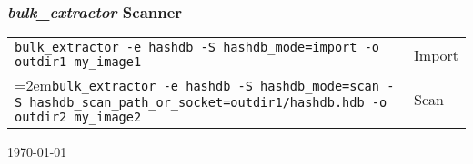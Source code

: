 \documentclass[12pt]{article}
\newcommand{\bulk}{\emph{bulk\_extractor}\xspace}
\begin{document}
\subsubsection*{\bulk Scanner}
\begin{tabular}{p{15 cm} p{4 cm} }
\texttt{bulk\_extractor -e hashdb -S hashdb\_mode=import -o outdir1 my\_image1} & Import \\
\hangindent=2em\texttt{bulk\_extractor -e hashdb -S hashdb\_mode=scan -S hashdb\_scan\_path\_or\_socket=outdir1/hashdb.hdb -o outdir2 my\_image2} & Scan \\
\end{tabular}

\vspace{2mm}
\begin{center}
\begin{footnotesize}
\today
\end{footnotesize}
\end{center}
\end{document}
